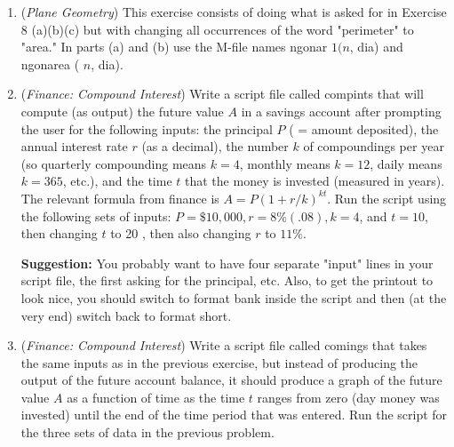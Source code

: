 \documentclass[../main.tex]{subfiles}
\begin{document}
\begin{enumerate}
\item (\emph{Plane Geometry}) This exercise consists of doing what is asked for in Exercise 8 (a)(b)(c) but with changing all occurrences of the word "perimeter" to "area." In parts (a) and (b) use the M-file names ngonar $1(n$, dia) and ngonarea ( $n$, dia).

\item (\emph{Finance: Compound Interest}) Write a script file called compints that will compute (as output) the future value $A$ in a savings account after prompting the user for the following inputs: the principal $P$ ( = amount deposited), the annual interest rate $r$ (as a decimal), the number $k$ of compoundings per year (so quarterly compounding means $k=4$, monthly means $k=12$, daily means $k=365$, etc.), and the time $t$ that the money is invested (measured in years). The relevant formula from finance is $A=P(1+r / k)^{k t}$. Run the script using the following sets of inputs: $P=\$ 10,000, r=8 \%(.08), k=4$, and $t=10$, then changing $t$ to 20 , then also changing $r$ to $11 \%$.

\textbf{Suggestion:} You probably want to have four separate "input" lines in your script file, the first asking for the principal, etc. Also, to get the printout to look nice, you should switch to format bank inside the script and then (at the very end) switch back to format short.

\item (\emph{Finance: Compound Interest}) Write a script file called comings that takes the same inputs as in the previous exercise, but instead of producing the output of the future account balance, it should produce a graph of the future value $A$ as a function of time as the time $t$ ranges from zero (day money was invested) until the end of the time period that was entered. Run the script for the three sets of data in the previous problem.


\end{enumerate}
\end{document}

